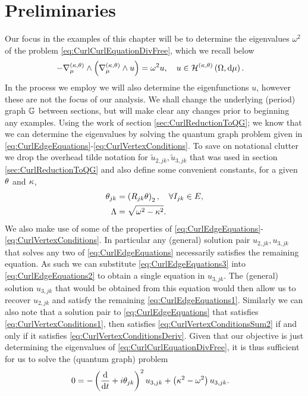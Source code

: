 \section{Preliminaries} \label{sec:ExamplePrelims}
Our focus in the examples of this chapter will be to determine the eigenvalues $\omega^2$ of the problem \eqref{eq:CurlCurlEquationDivFree}, which we recall below
\begin{align*}
	-\nabla_{\mu}^{\left( \kappa, \theta \right)}\wedge\left( \nabla_{\mu}^{\left( \kappa, \theta \right)}\wedge u \right) &= \omega^2 u, \quad u\in\mathcal{H}^{\left( \kappa, \theta \right)}\left( \Omega, \mathrm{d}\mu \right).
\end{align*}
In the process we employ we will also determine the eigenfunctions $u$, however these are not the focus of our analysis.
We shall change the underlying (period) graph $\mathbb{G}$ between sections, but will make clear any changes prior to beginning any examples.
Using the work of section \ref{sec:CurlReductionToQG}; we know that we can determine the eigenvalues by solving the quantum graph problem given in \eqref{eq:CurlEdgeEquations}-\eqref{eq:CurlVertexConditions}.
To save on notational clutter we drop the overhead tilde notation for $\widetilde{u}_{2,jk},\widetilde{u}_{3,jk}$ that was used in section \ref{sec:CurlReductionToQG} and also define some convenient constants, for a given $\theta$ and $\kappa$,
\begin{align*}
	\theta_{jk} &= \left( R_{jk}\theta \right)_2, \quad\forall I_{jk}\in E,\\
	\Lambda &= \sqrt{\omega^2 - \kappa^2}.
\end{align*}
We also make use of some of the properties of \eqref{eq:CurlEdgeEquations}-\eqref{eq:CurlVertexConditions}.
In particular any (general) solution pair $u_{2,jk},u_{3,jk}$ that solves any two of \eqref{eq:CurlEdgeEquations} necessarily satisfies the remaining equation.
As such we can substitute \eqref{eq:CurlEdgeEquations3} into \eqref{eq:CurlEdgeEquations2} to obtain a single equation in $u_{3,jk}$.
The (general) solution $u_{3,jk}$ that would be obtained from this equation would then allow us to recover $u_{2,jk}$ and satisfy the remaining \eqref{eq:CurlEdgeEquations1}.
Similarly we can also note that a solution pair to \eqref{eq:CurlEdgeEquations} that satisfies \eqref{eq:CurlVertexConditions1}, then satisfies \eqref{eq:CurlVertexConditionsSum2} if and only if it satisfies \eqref{eq:CurlVertexConditionsDeriv}.
Given that our objective is just determining the eigenvalues of \eqref{eq:CurlCurlEquationDivFree}, it is thus sufficient for us to solve the (quantum graph) problem
\begin{align} \label{eq:QGEquation}
	0 &= -\left( \dfrac{\mathrm{d}}{\mathrm{d}t} + i\theta_{jk} \right)^2 u_{3,jk} + \left( \kappa^2 - \omega^2 \right)u_{3,jk}.
\end{align}
